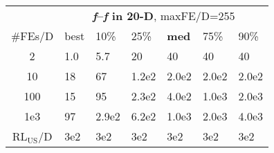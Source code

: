 \begin{tabular}{c|llllll}
 & \multicolumn{6}{|c}{\textbf{\textit{f}\raisebox{-0.35ex}{1}--\textit{f}\raisebox{-0.35ex}{55} in 20-D}, maxFE/D=255}\\
\#FEs/D & best & 10\% & 25\% & \textbf{med} & 75\% & 90\%\\
2 & \hspace*{1ex}1.0 & \hspace*{1ex}5.7 & 20 & 40 & 40 & 40\\
10 & 18 & 67 & 1.2e2 & 2.0e2 & 2.0e2 & 2.0e2\\
100 & 15 & 95 & 2.3e2 & 4.0e2 & 1.0e3 & 2.0e3\\
1e3 & 97 & 2.9e2 & 6.2e2 & 1.0e3 & 2.0e3 & 4.0e3\\
$\text{RL}_{\text{US}}$/D & 3e2 & 3e2 & 3e2 & 3e2 & 3e2 & 3e2
\end{tabular}
